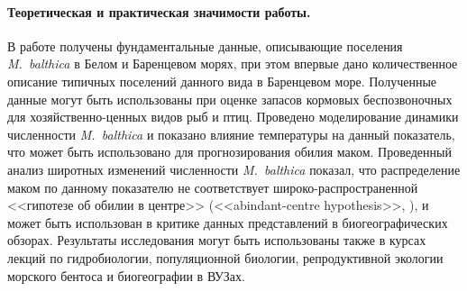 \paragraph{Теоретическая и практическая значимости работы.}
В работе получены фундаментальные данные, описывающие поселения \textit{M.~balthica} в Белом и Баренцевом морях, при этом впервые дано количественное описание типичных поселений данного вида в Баренцевом море. 
Полученные данные могут быть использованы при оценке запасов кормовых беспозвоночных для хозяйственно-ценных видов рыб и птиц.
Проведено моделирование динамики численности \textit{M.~balthica} и показано влияние температуры на данный показатель, что может быть использовано для прогнозирования обилия маком. 
Проведенный анализ широтных изменений численности \textit{M.~balthica} показал, что распределение маком по данному показателю не соответствует широко-распространенной  <<гипотезе об обилии в центре>> (<<abindant-centre hypothesis>>, \cite{Sagarin_et_al_2006}), и может быть использован в критике данных представлений в биогеографических обзорах.
Результаты исследования могут быть использованы также в курсах лекций по гидробиологии, популяционной биологии, репродуктивной экологии морского бентоса и биогеографии в ВУЗах.

